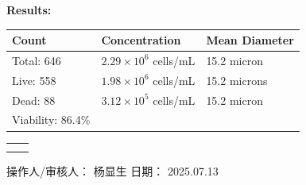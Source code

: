 \documentclass[UTF8,10pt,a4paper,fontset=fandol]{ctexart}
\newcommand{\fieldvalue}[1]{#1}
\newcommand{\handwritten}[1]{#1}
\begin{document}
\noindent
\textbf{Results:}

\vspace{0.5em}

\begin{tabularx}{\textwidth}{@{}XXX@{}}
\textbf{Count} & \textbf{Concentration} & \textbf{Mean Diameter} \\
\hline
Total:
\fieldvalue{646}
&
\fieldvalue{$2.29 \times 10^{6}$ cells/mL}
&
\fieldvalue{15.2 micron}
\\[0.35em]

Live:
\fieldvalue{558}
&
\fieldvalue{$1.98 \times 10^{6}$ cells/mL}
&
\fieldvalue{15.2 microns}
\\[0.35em]

Dead:
\fieldvalue{88}
&
\fieldvalue{$3.12 \times 10^{5}$ cells/mL}
&
\fieldvalue{15.2 micron}
\\[0.35em]

Viability:
\fieldvalue{86.4\%}
&
&
\end{tabularx}

\vspace{1em}

\noindent
\begin{center}
\setlength{\fboxsep}{0pt}
\begin{tabular}{cc}
\fbox{\rule{0pt}{0.22\textheight}\rule{0.44\textwidth}{0pt}} &
\fbox{\rule{0pt}{0.22\textheight}\rule{0.44\textwidth}{0pt}} \\[1em]
\fbox{\rule{0pt}{0.22\textheight}\rule{0.44\textwidth}{0pt}} &
\fbox{\rule{0pt}{0.22\textheight}\rule{0.44\textwidth}{0pt}}
\end{tabular}
\end{center}

\vfill

\noindent
操作人/审核人：
\fieldvalue{\handwritten{杨显生}}
\hfill
日期：
\fieldvalue{\handwritten{2025.07.13}}
\end{document}
